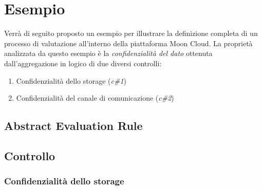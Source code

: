 \documentclass[../main.tex]{subfiles}
\begin{document}
\section{Esempio}

Verrà di seguito proposto un esempio per illustrare la definizione completa di un processo di valutazione all'interno della piattaforma Moon Cloud.
La proprietà analizzata da questo esempio è la \textit{confidenzialità del dato} ottenuta dall'aggregazione in  logico di due diversi controlli:
\begin{enumerate}
    \item{Confidenzialità dello storage (\textit{c\#1})}
    \item{Confidenzialità del canale di comunicazione (\textit{c\#2})}
\end{enumerate}

\subsection{Abstract Evaluation Rule}



\subsection{Controllo}


\subsubsection{Confidenzialità dello storage}
\end{document}
